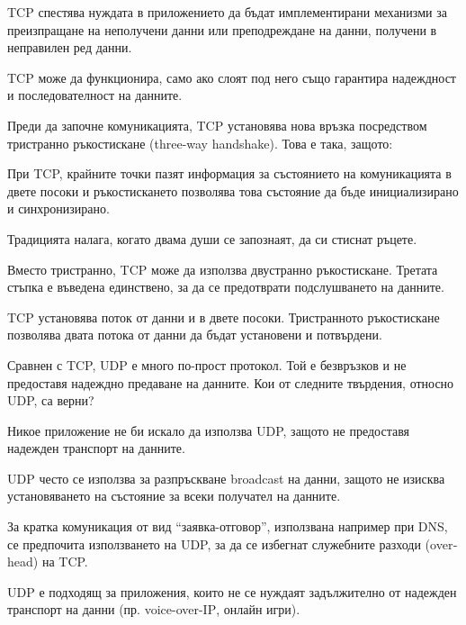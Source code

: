 \begin{questions}
\begin{choices}
    \CorrectChoice TCP спестява нуждата в приложението да бъдат имплементирани
    механизми за преизпращане на неполучени данни или преподреждане на данни,
    получени в неправилен ред данни.

    \choice TCP може да функционира, само ако слоят под него също гарантира
    надеждност и последователност на данните.
  \end{choices}

  \question[6] Преди да започне комуникацията, TCP установява нова връзка
  посредством тристранно ръкостискане (\foreignlanguage{english}{three-way
    handshake}). Това е така, защото:
  \begin{choices}

    \CorrectChoice При TCP, крайните точки пазят информация за състоянието на
    комуникацията в двете посоки и ръкостискането позволява това състояние да
    бъде инициализирано и синхронизирано.

    \choice Традицията налага, когато двама души се запознаят, да си стиснат
    ръцете.

    \choice Вместо тристранно, TCP може да използва двустранно
    ръкостискане. Третата стъпка е въведена единствено, за да се предотврати
    подслушването на данните.

    \CorrectChoice TCP установява поток от данни и в двете посоки. Тристранното
    ръкостискане позволява двата потока от данни да бъдат установени и потвърдени.
  \end{choices}

  \question[6] Сравнен с TCP, UDP е много по-прост протокол. Той е безвръзков и
  не предоставя надеждно предаване на данните. Кои от следните твърдения,
  относно UDP, са верни?
  \begin{choices}
    \choice Никое приложение не би искало да използва UDP, защото не предоставя
    надежден транспорт на данните.

    \CorrectChoice UDP често се използва за разпръскване
    \foreignlanguage{english}{broadcast} на данни, защото не изисква
    установяването на състояние за всеки получател на данните.

    \CorrectChoice За кратка комуникация от вид "`заявка-отговор"', използвана
    например при DNS, се предпочита използването на UDP, за да се избегнат
    служебните разходи (\foreignlanguage{english}{overhead}) на TCP.

    \CorrectChoice UDP е подходящ за приложения, които не се нуждаят
    задължително от надежден транспорт на данни
    (пр. \foreignlanguage{english}{voice-over-IP}, онлайн игри).
  \end{choices}


\end{questions}
